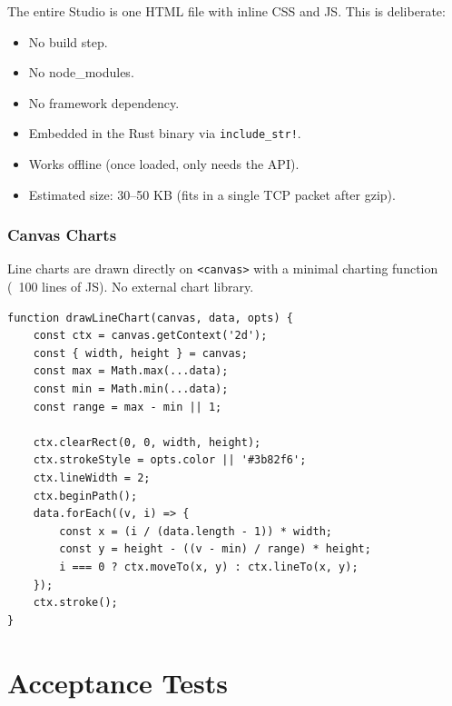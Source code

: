 \documentclass[11pt,a4paper,twoside]{article}
\begin{document}
The entire Studio is one HTML file with inline CSS and JS. This is
deliberate:
\begin{itemize}[nosep]
  \item No build step.
  \item No node\_modules.
  \item No framework dependency.
  \item Embedded in the Rust binary via \texttt{include\_str!}.
  \item Works offline (once loaded, only needs the API).
  \item Estimated size: 30--50 KB (fits in a single TCP packet after
        gzip).
\end{itemize}

\section{Canvas Charts}\label{sec:charts}

Line charts are drawn directly on \texttt{<canvas>} with a minimal
charting function (~100 lines of JS). No external chart library.

\begin{lstlisting}[title={Minimal Canvas Chart}]
function drawLineChart(canvas, data, opts) {
    const ctx = canvas.getContext('2d');
    const { width, height } = canvas;
    const max = Math.max(...data);
    const min = Math.min(...data);
    const range = max - min || 1;

    ctx.clearRect(0, 0, width, height);
    ctx.strokeStyle = opts.color || '#3b82f6';
    ctx.lineWidth = 2;
    ctx.beginPath();
    data.forEach((v, i) => {
        const x = (i / (data.length - 1)) * width;
        const y = height - ((v - min) / range) * height;
        i === 0 ? ctx.moveTo(x, y) : ctx.lineTo(x, y);
    });
    ctx.stroke();
}
\end{lstlisting}


\part{Acceptance Tests}\label{part:tests}
\end{document}
